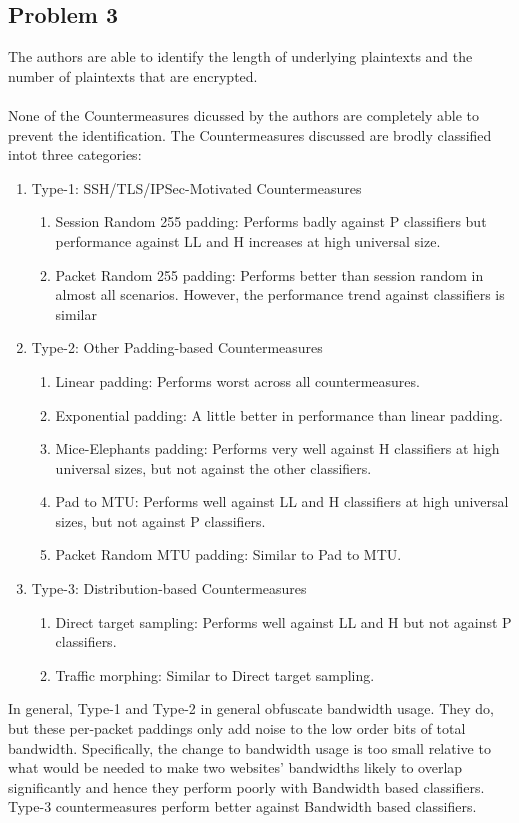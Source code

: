 \documentclass[10pt]{article}
\begin{document}
\begin{itemize}
\section{Problem 3}
The authors are able to identify the length of underlying plaintexts and the number of plaintexts that are encrypted.\\\\
None of the Countermeasures dicussed by the authors are completely able to prevent the identification. The Countermeasures discussed are brodly classified intot three categories:
\begin{enumerate}
\item Type-1: SSH/TLS/IPSec-Motivated Countermeasures
\begin{enumerate}
\item Session Random 255 padding: Performs badly against P classifiers but performance against LL and H increases at high universal size.
\item Packet Random 255 padding: Performs better than session random in almost all scenarios. However, the performance trend against classifiers is similar
\end{enumerate}
\item Type-2: Other Padding-based Countermeasures
\begin{enumerate}
\item Linear padding: Performs worst across all countermeasures.
\item Exponential padding: A little better in performance than linear padding.
\item Mice-Elephants padding: Performs very well against H classifiers at high universal sizes, but not against the other classifiers.
\item Pad to MTU: Performs well against LL and H classifiers at high universal sizes, but not against P classifiers.
\item Packet Random MTU padding: Similar to Pad to MTU.
\end{enumerate}
\item Type-3: Distribution-based Countermeasures
\begin{enumerate}
\item Direct target sampling: Performs well against LL and H but not against P classifiers.
\item Traffic morphing: Similar to Direct target sampling.
\end{enumerate}
\end{enumerate}
In general, Type-1 and Type-2 in general obfuscate bandwidth usage. They do, but these per-packet paddings only add noise to the low order bits of total bandwidth. Specifically, the change to bandwidth usage is too small relative to what would be needed to make two websites’ bandwidths likely to overlap significantly and hence they perform poorly with Bandwidth based classifiers. Type-3 countermeasures perform better against Bandwidth based classifiers.

\end{itemize}
\end{document}
